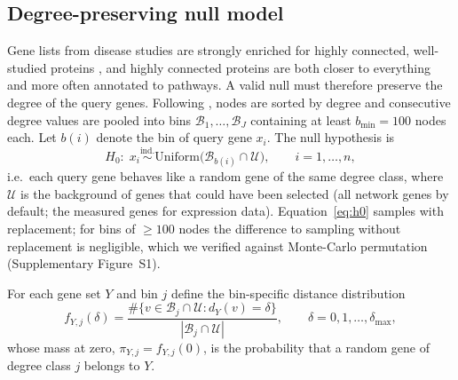 \subsection{Degree-preserving null model}
Gene lists from disease studies are strongly enriched for highly connected, well-studied proteins \citep{Barabasi2011,Haynes2018}, and highly connected proteins are both closer to everything and more often annotated to pathways. A valid null must therefore preserve the degree of the query genes. Following \citet{Guney2016}, nodes are sorted by degree and consecutive degree values are pooled into bins $\mathcal{B}_1, \dots, \mathcal{B}_J$ containing at least $b_{\min} = 100$ nodes each. Let $b(i)$ denote the bin of query gene $x_i$. The null hypothesis is
\begin{equation}
H_0:\; x_i \overset{\text{ind.}}{\sim} \mathrm{Uniform}\big(\mathcal{B}_{b(i)} \cap \mathcal{U}\big),\qquad i = 1, \dots, n,
\label{eq:h0}
\end{equation}
i.e.\ each query gene behaves like a random gene of the same degree class, where $\mathcal{U}$ is the background of genes that could have been selected (all network genes by default; the measured genes for expression data). Equation~\eqref{eq:h0} samples with replacement; for bins of $\ge 100$ nodes the difference to sampling without replacement is negligible, which we verified against Monte-Carlo permutation (Supplementary Figure~S1).

For each gene set $Y$ and bin $j$ define the bin-specific distance distribution
\begin{equation}
f_{Y,j}(\delta) = \frac{\#\{v \in \mathcal{B}_j \cap \mathcal{U} : d_Y(v) = \delta\}}{|\mathcal{B}_j \cap \mathcal{U}|}, \qquad \delta = 0, 1, \dots, \delta_{\max},
\end{equation}
whose mass at zero, $\pi_{Y,j} = f_{Y,j}(0)$, is the probability that a random gene of degree class $j$ belongs to $Y$.

